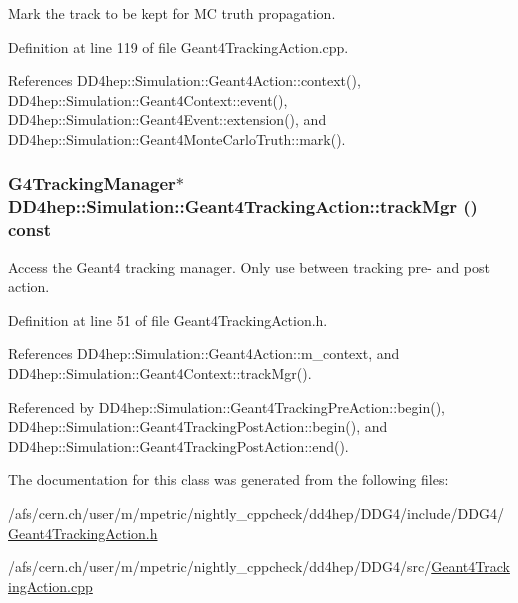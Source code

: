 Mark the track to be kept for MC truth propagation. 

Definition at line 119 of file Geant4TrackingAction.cpp.

References DD4hep::Simulation::Geant4Action::context(), DD4hep::Simulation::Geant4Context::event(), DD4hep::Simulation::Geant4Event::extension(), and DD4hep::Simulation::Geant4MonteCarloTruth::mark().\hypertarget{class_d_d4hep_1_1_simulation_1_1_geant4_tracking_action_af4da71cb09509d4c7598c22f2b725e24}{
\subsubsection[{trackMgr}]{\setlength{\rightskip}{0pt plus 5cm}G4TrackingManager$\ast$ DD4hep::Simulation::Geant4TrackingAction::trackMgr () const}}
\label{class_d_d4hep_1_1_simulation_1_1_geant4_tracking_action_af4da71cb09509d4c7598c22f2b725e24}


Access the Geant4 tracking manager. Only use between tracking pre-\/ and post action. 

Definition at line 51 of file Geant4TrackingAction.h.

References DD4hep::Simulation::Geant4Action::m\_\-context, and DD4hep::Simulation::Geant4Context::trackMgr().

Referenced by DD4hep::Simulation::Geant4TrackingPreAction::begin(), DD4hep::Simulation::Geant4TrackingPostAction::begin(), and DD4hep::Simulation::Geant4TrackingPostAction::end().

The documentation for this class was generated from the following files:\begin{DoxyCompactItemize}
\item 
/afs/cern.ch/user/m/mpetric/nightly\_\-cppcheck/dd4hep/DDG4/include/DDG4/\hyperlink{_geant4_tracking_action_8h}{Geant4TrackingAction.h}\item 
/afs/cern.ch/user/m/mpetric/nightly\_\-cppcheck/dd4hep/DDG4/src/\hyperlink{_geant4_tracking_action_8cpp}{Geant4TrackingAction.cpp}\end{DoxyCompactItemize}
